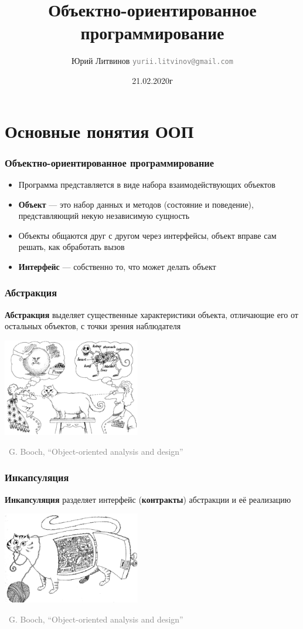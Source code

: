 \documentclass[xetex,mathserif,serif]{beamer}
\title{Объектно-ориентированное программирование}
\author[Юрий Литвинов]{Юрий Литвинов \newline \textcolor{gray}{\small\texttt{yurii.litvinov@gmail.com}}}
\date{21.02.2020г}
\newcommand{\attribution}[1] {
	\begin{flushright}\begin{scriptsize}\textcolor{gray}{\textcopyright\, #1}\end{scriptsize}\end{flushright}
}
\begin{document}
	
	\frame{\titlepage}

	\section{Основные понятия ООП}

	\begin{frame}
		\frametitle{Объектно-ориентированное программирование}
		\begin{itemize}
			\item Программа представляется в виде набора взаимодействующих объектов
			\item \textbf{Объект} --- это набор данных и методов (состояние и поведение), представляющий некую независимую сущность
			\item Объекты общаются друг с другом через интерфейсы, объект вправе сам решать, как обработать вызов
			\item \textbf{Интерфейс} --- собственно то, что может делать объект
		\end{itemize}
	\end{frame}

	\begin{frame}
		\frametitle{Абстракция}
		\textbf{Абстракция} выделяет существенные характеристики объекта, отличающие его от остальных объектов, с точки зрения наблюдателя
		\vskip 1cm
		\begin{center}
			\includegraphics[width=0.45\textwidth]{abstraction.png}
		\end{center}
		\attribution{G. Booch, ``Object-oriented analysis and design''}
	\end{frame}

	\begin{frame}
		\frametitle{Инкапсуляция}
		\textbf{Инкапсуляция} разделяет интерфейс (\textbf{контракты}) абстракции и её реализацию

		\vskip 1cm
		\begin{center}
			\includegraphics[width=0.45\textwidth]{incapsulation.png}
		\end{center}
		\attribution{G. Booch, ``Object-oriented analysis and design''}
	\end{frame}
\end{document}
